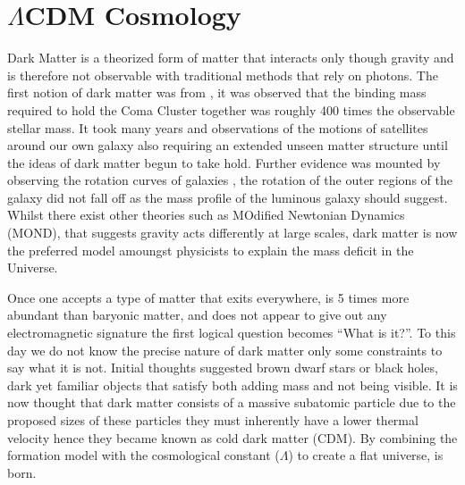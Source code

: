 \section{$\Lambda$CDM Cosmology}
\label{sec:LCDM}
Dark Matter is a theorized form of matter that interacts only though gravity and is therefore not observable with traditional methods that rely on photons. The first notion of dark matter was from \citet{Zwicky1933DieNebeln}, it was observed that the binding mass required to hold the Coma Cluster together was roughly 400 times the observable stellar mass. It took many years and observations of the motions of satellites around our own galaxy also requiring an extended unseen matter structure until the ideas of dark matter begun to take hold. Further evidence was mounted by observing the rotation curves of galaxies \citep{Roberts1973ComparisonTypes}, the rotation of the outer regions of the galaxy did not fall off as the mass profile of the luminous galaxy should suggest. Whilst there exist other theories such as MOdified Newtonian Dynamics (MOND), that suggests gravity acts differently at large scales, dark matter is now the preferred model amoungst physicists to explain the mass deficit in the Universe. 

Once one accepts a type of matter that exits everywhere, is 5 times more abundant than baryonic matter, and does not appear to give out any electromagnetic signature the first logical question becomes ``What is it?''. To this day we do not know the precise nature of dark matter only some constraints to say what it is not. Initial thoughts suggested brown dwarf stars or black holes, dark yet familiar objects that satisfy both adding mass and not being visible. It is now thought that dark matter consists of a massive subatomic particle due to the proposed sizes of these particles they must inherently have a lower thermal velocity hence they became known as cold dark matter (CDM). By combining the formation model with the cosmological constant ($\Lambda$) to create a flat universe, \LCDM is born. 

